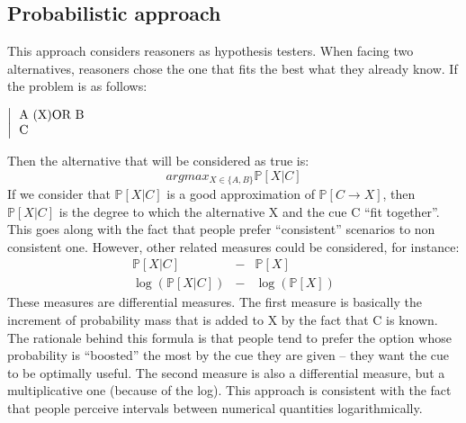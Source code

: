 \documentclass[french]{article}
\begin{document}
\subsection{Probabilistic approach}
This approach considers reasoners as hypothesis testers. When facing two alternatives, reasoners chose the one that fits the best what they already know. If the problem is as follows:
\begin{center}
	$\left |\begin{tabular}{l}
	A (X)OR B\\
	C
\end{tabular}\right.$
\end{center}
Then the alternative that will be considered as true is:
\begin{equation*}
argmax_{X \in \lbrace A, B \rbrace} \mathbb{P}[X|C]
\end{equation*}
If we consider that $\mathbb{P}[X|C]$ is a good approximation of $\mathbb{P}[C\rightarrow X]$, then $\mathbb{P}[X|C]$ is the degree to which the alternative X and the cue C ``fit together''. This goes along with the fact that people prefer ``consistent'' scenarios to non consistent one. However, other related measures could be considered, for instance:
\begin{eqnarray*}
\mathbb{P}[X|C] &-& \mathbb{P}[X]\\
\log(\mathbb{P}[X|C]) &-& \log(\mathbb{P}[X])
\end{eqnarray*}
These measures are differential measures. The first measure is basically the increment of probability mass that is added to X by the fact that C is known. The rationale behind this formula is that people tend to prefer the option whose probability is ``boosted'' the most by the cue they are given -- they want the cue to be optimally useful. The second measure is also a differential measure, but a multiplicative one (because of the log). This approach is consistent with the fact that people perceive intervals between numerical quantities logarithmically.
\end{document}
